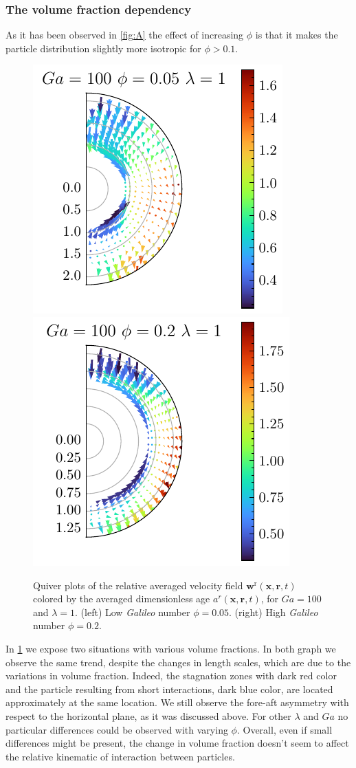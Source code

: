 \subsubsection*{The volume fraction dependency}
As it has been observed in \ref{fig:A} the effect of increasing $\phi$ is that it makes the particle distribution slightly more isotropic for $\phi >0.1$. 
\begin{figure}[h!]
    \centering
    \includegraphics[height=0.35\textwidth]{image/HOMOGENEOUS_NEW/Dist/U_rel_l_1_Ga_100_PHI_5.pdf}
    \includegraphics[height=0.35\textwidth]{image/HOMOGENEOUS_NEW/Dist/U_rel_l_1_Ga_100_PHI_20.pdf}
    \caption{Quiver plots of the relative averaged velocity field $\textbf{w}^\text{r}(\textbf{x},\textbf{r},t)$ colored by the averaged dimensionless age $a^r(\textbf{x},\textbf{r},t)$, for $Ga = 100$ and $\lambda = 1$. 
    (left) Low \textit{Galileo} number $\phi = 0.05$.
    (right) High \textit{Galileo} number $\phi = 0.2$. }
    \label{fig:Why_Phi_matter}
\end{figure}
In \ref{fig:Why_Phi_matter} we expose two situations with various volume fractions. 
In both graph we observe the same trend, despite the changes in length scales, which are due to the variations in volume fraction. 
Indeed, the stagnation zones with dark red color and the particle resulting from short interactions, dark blue color, are located approximately at the same location. 
We still observe the fore-aft asymmetry with respect to the horizontal plane, as it was discussed above. 
For other $\lambda$ and $Ga$ no particular differences could be observed with varying $\phi$. 
Overall, even if small differences might be present, the change in volume fraction doesn't seem to affect the relative kinematic of interaction between particles. 


